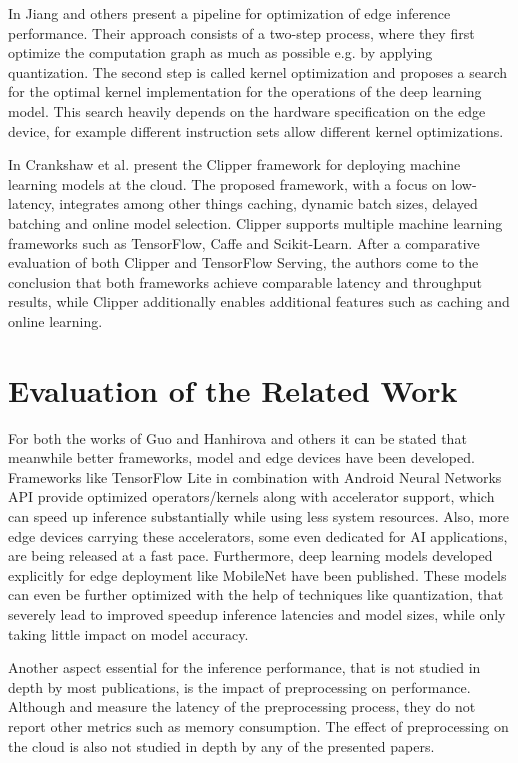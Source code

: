 In \cite{jiang2018efficient} Jiang and others present a pipeline for optimization of edge inference performance.
Their approach consists of a two-step process, where they first optimize the computation graph as much as possible e.g. by applying quantization.
The second step is called kernel optimization and proposes a search for the optimal kernel implementation for the operations of the deep learning model.
This search heavily depends on the hardware specification on the edge device, for example different instruction sets allow different kernel optimizations.

In \cite{201468} Crankshaw et al. present the Clipper framework for deploying machine learning models at the cloud.
The proposed framework, with a focus on low-latency, integrates among other things caching, dynamic batch sizes, delayed batching and online model selection.
Clipper supports multiple machine learning frameworks such as TensorFlow, Caffe and Scikit-Learn.
After a comparative evaluation of both Clipper and TensorFlow Serving, the authors come to the conclusion that both frameworks achieve comparable latency and throughput results, while Clipper additionally enables additional features such as caching and online learning.

\section{Evaluation of the Related Work}
For both the works of Guo\cite{DBLP:conf/ic2e/Guo18} and Hanhirova and others\cite{DBLP:conf/mmsys/HanhirovaKSSHY18} it can be stated that meanwhile better frameworks, model and edge devices have been developed.
Frameworks like TensorFlow Lite in combination with Android Neural Networks API provide optimized operators/kernels along with accelerator support, which can speed up inference substantially while using less system resources.
Also, more edge devices carrying these accelerators, some even dedicated for AI applications, are being released at a fast pace.
Furthermore, deep learning models developed explicitly for edge deployment like MobileNet have been published. These models can even be further optimized with the help of techniques like quantization, that severely lead to improved speedup inference latencies and model sizes, while only taking little impact on model accuracy.

Another aspect essential for the inference performance, that is not studied in depth by most publications, is the impact of preprocessing on performance.
Although \cite{DBLP:conf/ic2e/Guo18} and \cite{DBLP:conf/mmsys/HanhirovaKSSHY18} measure the latency of the preprocessing process, they do not report other metrics such as memory consumption. The effect of preprocessing on the cloud is also not studied in depth by any of the presented papers.


